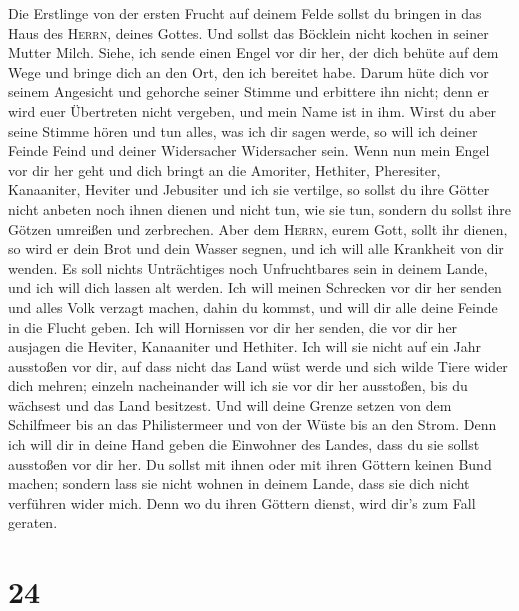 Die Erstlinge von der ersten Frucht auf deinem Felde
sollst du bringen in das Haus des \textsc{Herrn}, deines Gottes. Und
sollst das Böcklein nicht kochen in seiner Mutter Milch. 
Siehe, ich sende einen Engel vor dir her, der dich behüte auf dem Wege
und bringe dich an den Ort, den ich bereitet habe.  Darum
hüte dich vor seinem Angesicht und gehorche seiner Stimme und erbittere
ihn nicht; denn er wird euer Übertreten nicht vergeben, und mein Name
ist in ihm.  Wirst du aber seine Stimme hören und tun
alles, was ich dir sagen werde, so will ich deiner Feinde Feind und
deiner Widersacher Widersacher sein.  Wenn nun mein Engel
vor dir her geht und dich bringt an die Amoriter, Hethiter, Pheresiter,
Kanaaniter, Heviter und Jebusiter und ich sie vertilge, 
so sollst du ihre Götter nicht anbeten noch ihnen dienen und nicht tun,
wie sie tun, sondern du sollst ihre Götzen umreißen und zerbrechen.
 Aber dem \textsc{Herrn}, eurem Gott, sollt ihr dienen,
so wird er dein Brot und dein Wasser segnen, und ich will alle Krankheit
von dir wenden.  Es soll nichts Unträchtiges noch
Unfruchtbares sein in deinem Lande, und ich will dich lassen alt werden.
 Ich will meinen Schrecken vor dir her senden und alles
Volk verzagt machen, dahin du kommst, und will dir alle deine Feinde in
die Flucht geben.  Ich will Hornissen vor dir her senden,
die vor dir her ausjagen die Heviter, Kanaaniter und Hethiter.
 Ich will sie nicht auf ein Jahr ausstoßen vor dir, auf
dass nicht das Land wüst werde und sich wilde Tiere wider dich mehren;
 einzeln nacheinander will ich sie vor dir her ausstoßen,
bis du wächsest und das Land besitzest.  Und will deine
Grenze setzen von dem Schilfmeer bis an das Philistermeer und von der
Wüste bis an den Strom. Denn ich will dir in deine Hand geben die
Einwohner des Landes, dass du sie sollst ausstoßen vor dir her.
 Du sollst mit ihnen oder mit ihren Göttern keinen Bund
machen;  sondern lass sie nicht wohnen in deinem Lande,
dass sie dich nicht verführen wider mich. Denn wo du ihren Göttern
dienst, wird dir's zum Fall geraten.

\hypertarget{section-23}{%
\section{24}\label{section-23}}


